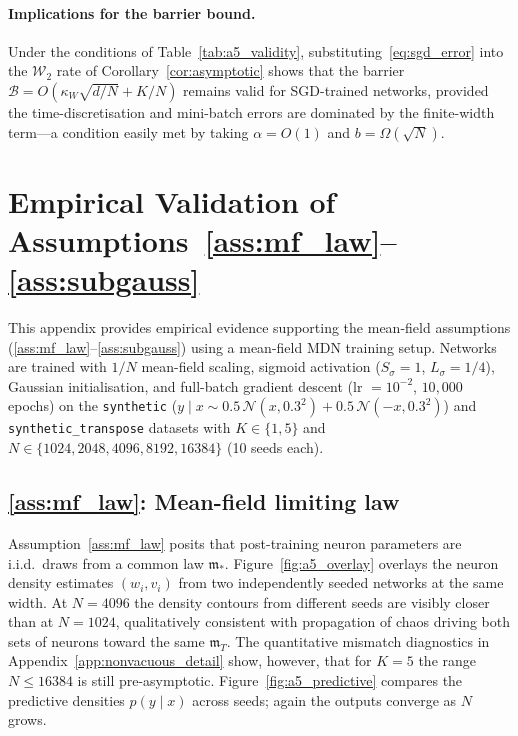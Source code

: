 \documentclass[11pt]{article}
\newcommand{\cW}{\mathcal{W}}
\newcommand{\cN}{\mathcal{N}}
\newcommand{\cB}{\mathcal{B}}
\begin{document}
\paragraph{Implications for the barrier bound.}
Under the conditions of Table~\ref{tab:a5_validity},
substituting~\eqref{eq:sgd_error} into the $\cW_2$ rate of
Corollary~\ref{cor:asymptotic} shows that the barrier
$\cB = O(\kappa_W\sqrt{d/N} + K/N)$ remains valid for SGD-trained networks,
provided the time-discretisation and mini-batch errors are dominated
by the finite-width term---a condition easily met by taking
$\alpha = O(1)$ and $b = \Omega(\sqrt{N})$.

\section{Empirical Validation of Assumptions~\ref{ass:mf_law}--\ref{ass:subgauss}}\label{app:assumption_validation}

This appendix provides empirical evidence supporting the
mean-field assumptions (\ref{ass:mf_law}--\ref{ass:subgauss}) using a mean-field MDN
training setup.
Networks are trained with $1/N$ mean-field scaling,
sigmoid activation ($S_\sigma = 1$, $L_\sigma = 1/4$),
Gaussian initialisation, and full-batch gradient descent
(lr $= 10^{-2}$, $10{,}000$ epochs)
on the
\texttt{synthetic} ($y \mid x \sim 0.5\,\cN(x, 0.3^2)
+ 0.5\,\cN(-x, 0.3^2)$) and
\texttt{synthetic\_transpose} datasets
with $K \in \{1, 5\}$ and
$N \in \{1024, 2048, 4096, 8192, 16384\}$ (10 seeds each).

\subsection{\ref{ass:mf_law}: Mean-field limiting law}\label{app:a5_validation}

Assumption~\ref{ass:mf_law} posits that post-training neuron parameters
are i.i.d.\ draws from a common law $\mathfrak{m}_*$.
Figure~\ref{fig:a5_overlay} overlays the neuron density estimates
$(w_i, v_i)$ from two independently seeded networks at the same width.
At $N = 4096$ the density contours from different seeds are visibly
closer than at $N=1024$, qualitatively consistent with propagation of
chaos driving both sets of neurons toward the same $\mathfrak{m}_T$.
The quantitative mismatch diagnostics in
Appendix~\ref{app:nonvacuous_detail} show, however, that for
$K=5$ the range $N \le 16384$ is still pre-asymptotic.
Figure~\ref{fig:a5_predictive} compares the predictive densities
$p(y \mid x)$ across seeds; again the outputs converge as $N$ grows.
\end{document}
